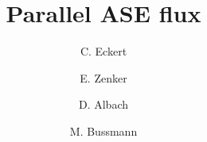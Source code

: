 \documentclass[3p,twocolumn]{elsarticle}
\begin{document}
\title{Parallel ASE flux}

\author[hzdr]{C. Eckert}

\author[hzdr]{E. Zenker}

\author[hzdr]{D. Albach}

\author[hzdr]{M. Bussmann}

\address[hzdr]{
  Institute of Radiation Physics, 
  Helmholtz-Zentrum Dresden-Rossendorf e. V.,
  Bautzner Landstra\ss e 400,
  01328 Dresden,  
  Germany
}



\maketitle






		




\end{document}
